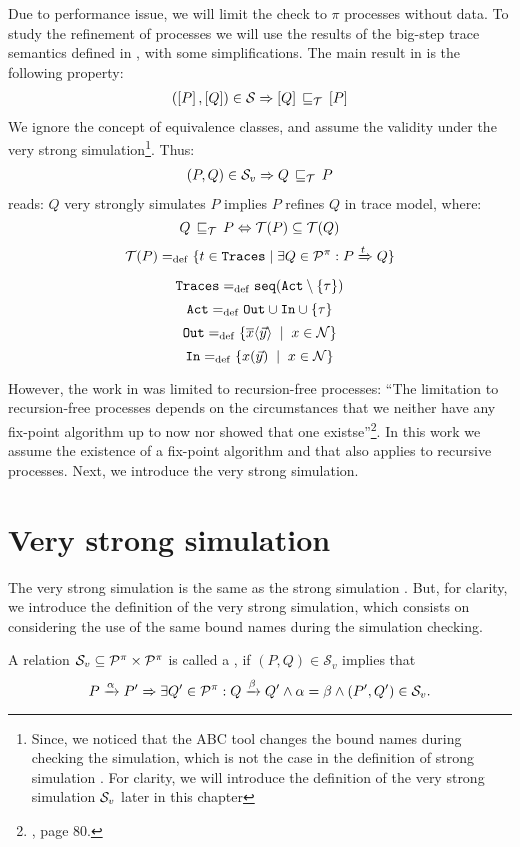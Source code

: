 Due to performance issue, we will limit the check to $\pi$ processes without data. To study the refinement of \picalc{} processes we will use the results of the big-step trace semantics defined in \cite{gieseking}, with some simplifications. 
The main result in \cite{gieseking} is the following property:
\begin{align}
    (\ec{P},\ec{Q})\in{}\simu \Rightarrow \ec{Q} \refi \ec{P} \label{property1}
\end{align}
We ignore the concept of equivalence classes, and assume the validity under the very strong simulation\footnote{Since, we noticed that the ABC tool changes the bound names during checking the simulation, which is not the case in the definition of strong simulation . For clarity, we will introduce the definition of the very strong simulation $\mathcal{S}_v$ later in this chapter}. Thus:
\begin{align}
    (P,Q)\in{}\simuv \Rightarrow Q \refi P
\label{property2}
\end{align}
 reads: $Q$ very strongly simulates $P$ implies $P$ refines $Q$ in trace model, where:
\[Q\refi P \Leftrightarrow \Traces[P]\subseteq\Traces[Q]\]
\[\Traces[P] \define \{t\in \tr \mid \exists Q\in\procs: P \bigstep{t} Q\}\]
\[\tr \define \seqset{\actions\setminus\set{\tau}}\]
\[\actions\define\outA\cup\inA\cup\set{\tau}\]
\[\outA\define\set[x\in\names]{\out{x}{\vec{y}}}\]
\[\inA\define\set[x\in\names]{\inp{x}{\vec{y}}}\]

However, the work in \cite{gieseking} was limited to recursion-free processes: ``The limitation to recursion-free processes depends on the circumstances that we neither have any fix-point algorithm up to now nor showed that one existse''\footnote{\cite{gieseking}, page $80$.}. In this work we assume the existence of a fix-point algorithm and that  also applies to recursive processes.
Next, we introduce the very strong simulation.
\section{Very strong simulation}
\label{sec_failure-refinement}
The very strong simulation is the same as the strong simulation . But, for clarity, we introduce the definition of the very strong simulation, which consists on considering the use of the same bound names during the simulation checking.

\begin{definition}
\label{def_strong_sim}
A relation $\mathcal{S}_v\subseteq\mathcal P^{\pi}\times\mathcal P^{\pi}$ is called a , if $(P,Q)\in\mathcal{S}_v$ implies that
\[P \xrightarrow{\alpha} P' \Rightarrow \exists Q'\in\mathcal P^{\pi}: Q \xrightarrow{\beta} Q' \wedge \alpha = \beta \wedge (P',Q')\in\mathcal{S}_v.\]
\end{definition}

